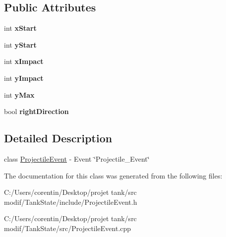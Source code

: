 \subsection*{Public Attributes}
\begin{DoxyCompactItemize}
\item 
\mbox{\label{classstate_1_1_projectile_event_ab931a89ed170f9222d643f3713738cf1}} 
int {\bfseries x\+Start}
\item 
\mbox{\label{classstate_1_1_projectile_event_aed1874d2894fcc6629eaa07f569416b2}} 
int {\bfseries y\+Start}
\item 
\mbox{\label{classstate_1_1_projectile_event_a0ba25dfd2661474f0fdbdd4a6a201efa}} 
int {\bfseries x\+Impact}
\item 
\mbox{\label{classstate_1_1_projectile_event_af7d792e2b10cba7ab4e70eefb2208217}} 
int {\bfseries y\+Impact}
\item 
\mbox{\label{classstate_1_1_projectile_event_a83b5a7e8e24361cfcebb5496008424bc}} 
int {\bfseries y\+Max}
\item 
\mbox{\label{classstate_1_1_projectile_event_a641c54c8c1bda4cae0e4547b4c2a1d4a}} 
bool {\bfseries right\+Direction}
\end{DoxyCompactItemize}


\subsection{Detailed Description}
class \hyperlink{classstate_1_1_projectile_event}{Projectile\+Event} -\/ Event \char`\"{}\+Projectile\+\_\+\+Event\char`\"{} 

The documentation for this class was generated from the following files\+:\begin{DoxyCompactItemize}
\item 
C\+:/\+Users/corentin/\+Desktop/projet tank/src modif/\+Tank\+State/include/Projectile\+Event.\+h\item 
C\+:/\+Users/corentin/\+Desktop/projet tank/src modif/\+Tank\+State/src/Projectile\+Event.\+cpp\end{DoxyCompactItemize}
